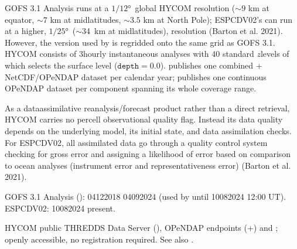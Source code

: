 \documentclass[a4paper,10pt,english]{sphinxmanual}
\begin{document}
\sphinxAtStartPar
GOFS 3.1 Analysis runs at a \(1/12\)° global HYCOM resolution (\(\sim 9\) km at equator, \(\sim7\) km at mid\sphinxhyphen{}latitudes, \(\sim 3.5\) km at North Pole); ESPC\sphinxhyphen{}D\sphinxhyphen{}V02’s can run at a higher, \(1/25\)° (\(\sim\)3\textendash{}4 km at mid\sphinxhyphen{}latitudes), resolution (Barton et al. 2021). However, the version used by  is regridded onto the same grid as GOFS 3.1. HYCOM consists of 3\sphinxhyphen{}hourly instantaneous analyses with 40 standard \(z\)\sphinxhyphen{}levels of which  selects the surface level (\(\texttt{depth}=0.0\)).  publishes one combined + NetCDF/OPeNDAP dataset per calendar year;  publishes one continuous OPeNDAP dataset per component spanning its whole coverage range.

\sphinxAtStartPar
{}

\sphinxAtStartPar
As a data\sphinxhyphen{}assimilative reanalysis/forecast product rather than a direct retrieval, HYCOM carries no per\sphinxhyphen{}cell observational quality flag. Instead its data quality depends on the underlying model, its initial state, and data assimilation checks. For ESPC\sphinxhyphen{}D\sphinxhyphen{}V02, all assimilated data go through a quality control system checking for gross error and assigning a likelihood of error based on comparison to ocean analyses (instrument error and representativeness error) (Barton et al. 2021).

\sphinxAtStartPar
{}

\sphinxAtStartPar
GOFS 3.1 Analysis (): 04\sphinxhyphen{}12\sphinxhyphen{}2018 \sphinxhyphen{} 04\sphinxhyphen{}09\sphinxhyphen{}2024 (used by  until 10\sphinxhyphen{}08\sphinxhyphen{}2024 12:00 UT). ESPC\sphinxhyphen{}D\sphinxhyphen{}V02: 10\sphinxhyphen{}08\sphinxhyphen{}2024 \sphinxhyphen{} present.

\sphinxAtStartPar
{}

\sphinxAtStartPar
HYCOM public THREDDS Data Server (), OPeNDAP endpoints  (+) and ; openly accessible, no registration required. See also .
\end{document}
